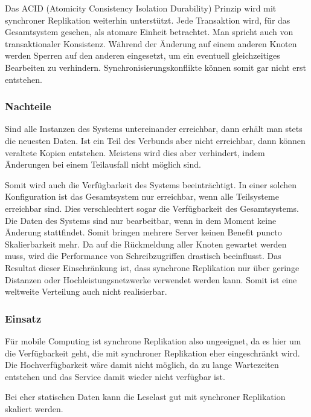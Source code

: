Das ACID (Atomicity Consistency Isolation Durability) Prinzip wird mit synchroner Replikation weiterhin unterstützt. Jede Transaktion wird, für das Gesamtsystem gesehen, als atomare Einheit betrachtet. Man spricht auch von transaktionaler Konsistenz. \cite{kaiserslautern} Während der Änderung auf einem anderen Knoten werden Sperren auf den anderen eingesetzt, um ein eventuell gleichzeitiges Bearbeiten zu verhindern. Synchronisierungskonflikte können somit gar nicht erst entstehen. \cite{ralfb}

\subsubsection{Nachteile}

Sind alle Instanzen des Systems untereinander erreichbar, dann erhält man stets die neuesten Daten. Ist ein Teil des Verbunds aber nicht erreichbar, dann können veraltete Kopien entstehen. Meistens wird dies aber verhindert, indem Änderungen bei einem Teilausfall nicht möglich sind. \cite{kaiserslautern}

Somit wird auch die Verfügbarkeit des Systems beeinträchtigt. In einer solchen Konfiguration ist das Gesamtsystem nur erreichbar, wenn alle Teilsysteme erreichbar sind. Dies verschlechtert sogar die Verfügbarkeit des Gesamtsystems. Die Daten des Systems sind nur bearbeitbar, wenn in dem Moment keine Änderung stattfindet. Somit bringen mehrere Server keinen Benefit puncto Skalierbarkeit mehr.
\clearpage
Da auf die Rückmeldung aller Knoten gewartet werden muss, wird die Performance von Schreibzugriffen drastisch beeinflusst. \cite{kaiserslautern} Das Resultat dieser Einschränkung ist, dass synchrone Replikation nur über geringe Distanzen oder Hochleistungsnetzwerke verwendet werden kann. \cite{itw} Somit ist eine weltweite Verteilung auch nicht realisierbar.

\subsubsection{Einsatz}

Für mobile Computing ist synchrone Replikation also ungeeignet, da es hier um die Verfügbarkeit geht, die mit synchroner Replikation eher eingeschränkt wird. Die Hochverfügbarkeit wäre damit nicht möglich, da zu lange Wartezeiten entstehen und das Service damit wieder nicht verfügbar ist.

Bei eher statischen Daten kann die Leselast gut mit synchroner Replikation skaliert werden.

